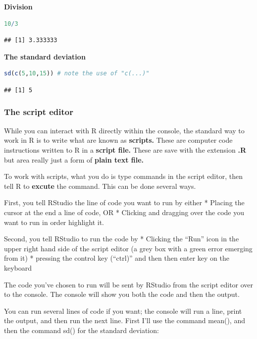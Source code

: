 \documentclass[
]{book}
\begin{document}
\textbf{Division}

\begin{lstlisting}[language=R]
10/3
\end{lstlisting}

\begin{lstlisting}
## [1] 3.333333
\end{lstlisting}

\textbf{The standard deviation}

\begin{lstlisting}[language=R]
sd(c(5,10,15)) # note the use of "c(...)"
\end{lstlisting}

\begin{lstlisting}
## [1] 5
\end{lstlisting}

\hypertarget{the-script-editor}{%
\subsubsection{The script editor}\label{the-script-editor}}

While you can interact with R directly within the console, the standard way to work in R is to write what are known as \textbf{scripts.} These are computer code instructions written to R in a \textbf{script file.} These are save with the extension \textbf{.R} but area really just a form of \textbf{plain text file.}

To work with scripts, what you do is type commands in the script editor, then tell R to \textbf{excute} the command. This can be done several ways.

First, you tell RStudio the line of code you want to run by either
* Placing the cursor at the end a line of code, OR
* Clicking and dragging over the code you want to run in order highlight it.

Second, you tell RStudio to run the code by
* Clicking the ``Run'' icon in the upper right hand side of the script editor (a grey box with a green error emerging from it)
* pressing the control key (``ctrl)'' and then then enter key on the keyboard

The code you've chosen to run will be sent by RStudio from the script editor over to the console. The console will show you both the code and then the output.

You can run several lines of code if you want; the console will run a line, print the output, and then run the next line. First I'll use the command mean(), and then the command sd() for the standard deviation:
\end{document}
